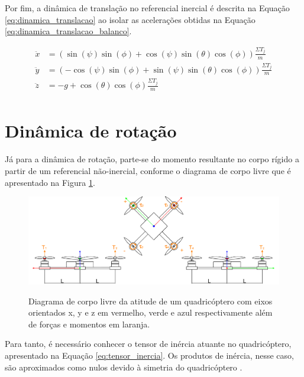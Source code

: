 \documentclass[main.tex]{subfiles}
\begin{document}
Por fim, a dinâmica de translação no referencial inercial é descrita na Equação \ref{eq:dinamica_translacao} ao isolar as acelerações obtidas na Equação \ref{eq:dinamica_translacao_balanco}.

\begin{equation}\label{eq:dinamica_translacao}
    \begin{split}
        \ddot{x} &= (\sin{(\psi)}\sin{(\phi)} + \cos{(\psi)}\sin{(\theta)}\cos{(\phi)})\frac{\Sigma T_j}{m}\\
        \ddot{y} &= (-\cos{(\psi)}\sin{(\phi)} + \sin{(\psi)}\sin{(\theta)}\cos{(\phi)})\frac{\Sigma T_j}{m}\\
        \ddot{z} &= -g + \cos{(\theta)}\cos{(\phi)}\frac{\Sigma T_j}{m}\\
    \end{split}
\end{equation}

\section{Dinâmica de rotação}

Já para a dinâmica de rotação, parte-se do momento resultante no corpo rígido a partir de um referencial não-inercial, conforme o diagrama de corpo livre que é apresentado na Figura \ref{fig:attitude_dcl}.

\begin{figure}[!h]
	\centering
	\caption{Diagrama de corpo livre da atitude de um quadricóptero com eixos orientados x, y e z em vermelho, verde e azul respectivamente além de forças e momentos em laranja.}
	\includegraphics[width=1\textwidth]{capitulos/modelagem/imgs/attitude_dcl.png}
	\label{fig:attitude_dcl}
\end{figure}

Para tanto, é necessário conhecer o tensor de inércia atuante no quadricóptero, apresentado na Equação \ref{eq:tensor_inercia}. Os produtos de inércia, nesse caso, são aproximados como nulos devido à simetria do quadricóptero \cite{justificativa_inercia}.
\end{document}
